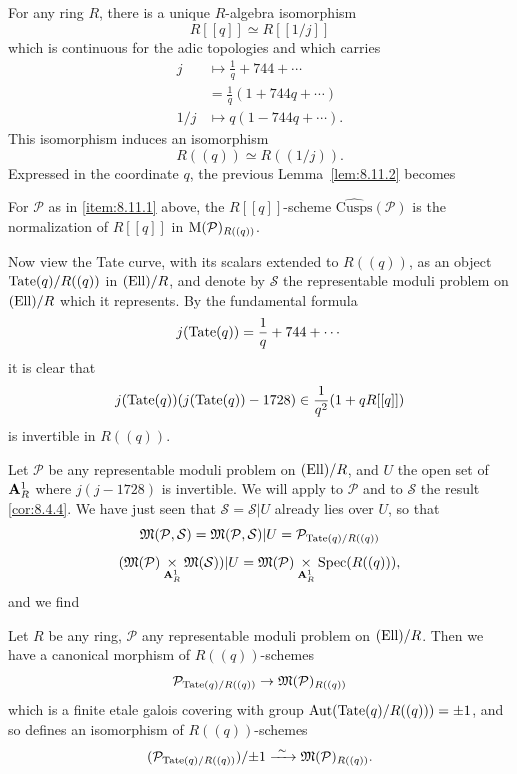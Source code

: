 \kmitem\label{item:8.11.3}
For any ring $R$, there is a unique $R$-algebra isomorphism
\[
R[[q]] \simeq R[[1/j]]
\]
which is continuous for the adic topologies and which carries
\[
\begin{aligned}
j &\mapsto \frac{1}{q} + 744 + \cdots \\
&= \frac{1}{q} (1 + 744q + \cdots) \\
1/j &\mapsto q(1 - 744q + \cdots) .
\end{aligned}
\]
This isomorphism induces an isomorphism
\[
R((q)) \simeq R((1/j)) .
\]
Expressed in the coordinate $q$, the previous Lemma~\ref{lem:8.11.2} becomes

\begin{klem}\label{lem:8.11.4}
For $\mathcal{P}$ as in \eqref{item:8.11.1} above, the $R[[q]]$-scheme $\widehat{\mathrm{Cusps}}(\mathcal{P})$ is the normalization of $R[[q]]$ in $\mathrm{M}(\mathcal{P})_{R((q))}$.
\end{klem}

\kmitem\label{item:8.11.5}
Now view the Tate curve, with its scalars extended to $R((q))$, as an object $\mathrm{Tate}(q)/R((q))$ in $(\mathrm{Ell})/R$, and denote by $\mathcal{S}$ the representable moduli problem on $(\mathrm{Ell})/R$ which it represents. By the fundamental formula
\[
j(\mathrm{Tate}(q)) = \frac{1}{q} + 744 + \cdots
\]
it is clear that
\[
j(\mathrm{Tate}(q))(j(\mathrm{Tate}(q)) - 1728) \in \frac{1}{q^2}(1 + q R[[q]])
\]
is invertible in $R((q))$.

\kmitem\label{item:8.11.6}
Let $\mathcal{P}$ be any representable moduli problem on $(\mathrm{Ell})/R$, and $U$ the open set of $\mathbf{A}^1_R$ where $j(j-1728)$ is invertible. We will apply to $\mathcal{P}$ and to $\mathcal{S}$ the result \eqref{cor:8.4.4}. We have just seen that $\mathcal{S} = \mathcal{S}|U$ already lies over $U$, so that
\[
\mathfrak{M}(\mathcal{P}, \mathcal{S}) = \mathfrak{M}(\mathcal{P}, \mathcal{S})|U = \mathcal{P}_{\mathrm{Tate}(q)/R((q))}
\]
\[
(\mathfrak{M}(\mathcal{P}) \underset{\mathbf{A}^1_R}{\times} \mathfrak{M}(\mathcal{S}))|U = \mathfrak{M}(\mathcal{P}) \underset{\mathbf{A}^1_R}{\times} \operatorname{Spec}(R((q))) ,
\]
and we find

\begin{kprop}\label{prop:8.11.7}
Let $R$ be any ring, $\mathcal{P}$ any representable moduli problem on $(\mathrm{Ell})/R$. Then we have a canonical morphism of $R((q))$-schemes
\[
\mathcal{P}_{\mathrm{Tate}(q)/R((q))} \to \mathfrak{M}(\mathcal{P})_{R((q))}
\]
which is a finite etale galois covering with group $\operatorname{Aut}(\mathrm{Tate}(q)/\allowbreak R((q))) = \pm 1$, and so defines an isomorphism of $R((q))$-schemes
\[
(\mathcal{P}_{\mathrm{Tate}(q)/R((q))})/{\pm 1} \xrightarrow{\ \sim\ } \mathfrak{M}(\mathcal{P})_{R((q))} .
\]
\end{kprop}

